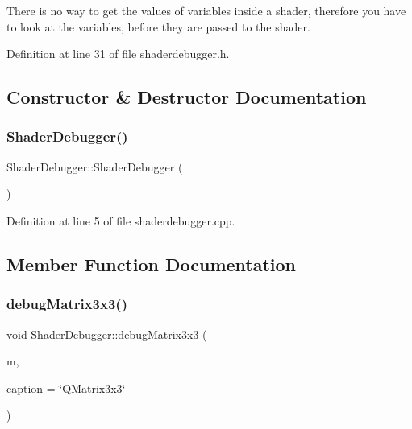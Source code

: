 There is no way to get the values of variables inside a shader, therefore you have to look at the variables, before they are passed to the shader. 

Definition at line 31 of file shaderdebugger.\+h.



\subsection{Constructor \& Destructor Documentation}
\mbox{\label{class_shader_debugger_a3c8f54bb5e86871315d8d398569a3dd6}} 
\subsubsection{\texorpdfstring{ShaderDebugger()}{ShaderDebugger()}}
{\footnotesize\ttfamily Shader\+Debugger\+::\+Shader\+Debugger (\begin{DoxyParamCaption}{ }\end{DoxyParamCaption})}



Definition at line 5 of file shaderdebugger.\+cpp.



\subsection{Member Function Documentation}
\mbox{\label{class_shader_debugger_a6fd11ef28da124fd558f329d55629ee8}} 
\subsubsection{\texorpdfstring{debugMatrix3x3()}{debugMatrix3x3()}}
{\footnotesize\ttfamily void Shader\+Debugger\+::debug\+Matrix3x3 (\begin{DoxyParamCaption}\item[{const Q\+Matrix3x3 \&}]{m,  }\item[{const Q\+String \&}]{caption = {\ttfamily \char`\"{}QMatrix3x3\char`\"{}} }\end{DoxyParamCaption})\hspace{0.3cm}{\ttfamily [static]}}



